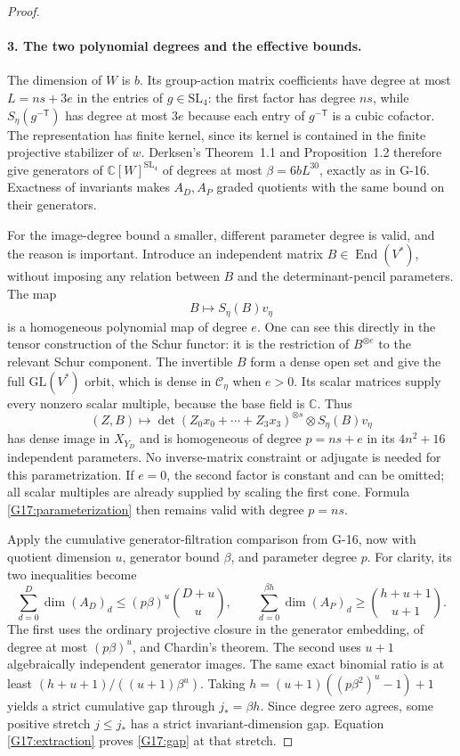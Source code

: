 \documentclass[11pt,a4paper]{article}
\theoremstyle{definition}\newtheorem{definition}{Definition}
\begin{document}
\begin{proof}
\paragraph{3. The two polynomial degrees and the effective bounds.}
The dimension of $W$ is $b$. Its group-action matrix coefficients
have degree at most $L=ns+3e$ in the entries of $g\in\mathrm{SL}_4$:
the first factor has degree $ns$, while $S_\eta(g^{-\mathsf T})$
has degree at most $3e$ because each entry of $g^{-\mathsf T}$ is
a cubic cofactor. The representation has finite kernel, since its
kernel is contained in the finite projective stabilizer of $w$.
Derksen's Theorem~1.1 and Proposition~1.2 therefore give generators
of $\mathbb C[W]^{\mathrm{SL}_4}$ of degrees at most
$\beta=6bL^{30}$, exactly as in G-16. Exactness of invariants makes
$A_D,A_P$ graded quotients with the same bound on their generators.

For the image-degree bound a smaller, different parameter degree
is valid, and the reason is important. Introduce an independent
matrix $B\in\operatorname{End}(V^*)$, without imposing any relation
between $B$ and the determinant-pencil parameters. The map
\[
 B\longmapsto S_\eta(B)v_\eta
\]
is a homogeneous polynomial map of degree $e$. One can see this
directly in the tensor construction of the Schur functor: it is
the restriction of $B^{\otimes e}$ to the relevant Schur component.
The invertible $B$ form a dense open set and give the full
$\mathrm{GL}(V^*)$ orbit, which is dense in $\mathcal C_\eta$
when $e>0$. Its scalar matrices supply every nonzero scalar
multiple, because the base field is $\mathbb C$.
Thus
\begin{equation}\label{G17:parameterization}
 (Z,B)\longmapsto
  \det(Z_0x_0+\cdots+Z_3x_3)^{\otimes s}
       \otimes S_\eta(B)v_\eta
\end{equation}
has dense image in $X_{Y_D}$ and is homogeneous of degree
$p=ns+e$ in its $4n^2+16$ independent parameters.
No inverse-matrix constraint or adjugate is needed for this
parametrization. If $e=0$, the second factor is constant and can
be omitted; all scalar multiples are already supplied by scaling
the first cone. Formula \eqref{G17:parameterization} then remains
valid with degree $p=ns$.

Apply the cumulative generator-filtration comparison from G-16,
now with quotient dimension $u$, generator bound $\beta$, and
parameter degree $p$. For clarity, its two inequalities become
\[
 \sum_{d=0}^{D}\dim(A_D)_d
       \leq(p\beta)^u\binom{D+u}{u},\qquad
 \sum_{d=0}^{\beta h}\dim(A_P)_d
       \geq\binom{h+u+1}{u+1}.
\]
The first uses the ordinary projective closure in the generator
embedding, of degree at most $(p\beta)^u$, and Chardin's theorem.
The second uses $u+1$ algebraically independent generator images.
The same exact binomial ratio is at least
$(h+u+1)/((u+1)\beta^u)$. Taking
$h=(u+1)((p\beta^2)^u-1)+1$ yields a strict cumulative gap through
$j_*=\beta h$. Since degree zero agrees, some positive stretch
$j\leq j_*$ has a strict invariant-dimension gap. Equation
\eqref{G17:extraction} proves \eqref{G17:gap} at that stretch.


\end{proof}
\end{document}
